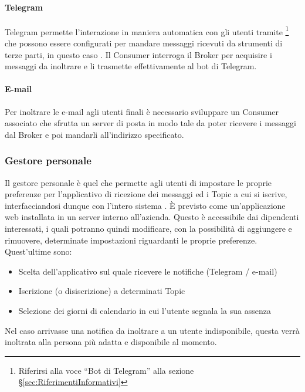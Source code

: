 		\paragraph{Telegram}
		Telegram permette l'interazione in maniera automatica con gli utenti tramite \footnote{Riferirsi alla voce ``Bot di Telegram'' alla sezione \S\ref{sec:RiferimentiInformativi}} che possono essere configurati per mandare messaggi ricevuti da strumenti di terze parti, in questo caso \progetto.
		Il Consumer interroga il Broker per acquisire i messaggi da inoltrare e li trasmette effettivamente al bot di Telegram.
		
		\paragraph{E-mail}
		Per inoltrare le e-mail agli utenti finali è necessario sviluppare un Consumer associato che sfrutta un server di posta in modo tale da poter ricevere i messaggi dal Broker e poi mandarli all'indirizzo specificato.
		
	
	\subsubsection{Gestore personale}
	Il gestore personale è quel  che permette agli utenti di impostare le proprie preferenze per l'applicativo di ricezione dei messaggi ed i Topic a cui si iscrive, interfacciandosi dunque con l'intero sistema \progetto.
	È previsto come un'applicazione web installata in un server interno all'azienda.
	Questo è accessibile dai dipendenti interessati, i quali potranno quindi modificare, con la possibilità di aggiungere e rimuovere, determinate impostazioni riguardanti le proprie preferenze.
	\newpage
	Quest'ultime sono:
	\begin{itemize}
		\item Scelta dell'applicativo sul quale ricevere le notifiche (Telegram / e-mail)
		\item Iscrizione (o disiscrizione) a determinati Topic
		\item Selezione dei giorni di calendario in cui l'utente segnala la sua assenza
	\end{itemize}
	Nel caso arrivasse una notifica da inoltrare a un utente indisponibile, questa verrà inoltrata alla persona più adatta e disponibile al momento.
	
